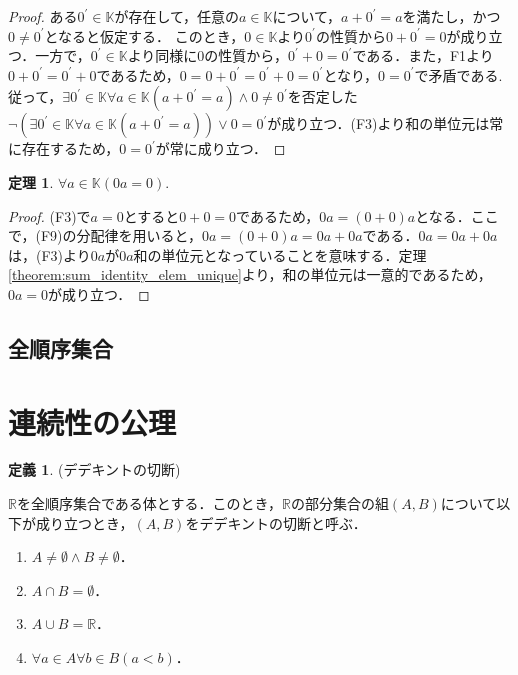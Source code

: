 \documentclass[oneside,openany]{jbook}
\theoremstyle{definition}
\newtheorem{theorem}{定理}
\newtheorem{definition}{定義}
\begin{document}
\begin{proof}
ある$0^{\prime} \in \mathbb{K}$が存在して，任意の$a \in \mathbb{K}$について，$a+0^{\prime}=a$を満たし，かつ$0 \neq 0^{\prime}$となると仮定する．
このとき，$0 \in \mathbb{K}$より$0^{\prime}$の性質から$0 + 0^{\prime} = 0$が成り立つ．一方で，$0^{\prime}  \in \mathbb{K}$より同様に$0$の性質から，$0^{\prime} + 0 = 0^{\prime}$である．また，F1より$0+0^{\prime}=0^{\prime}+0$であるため，$0=0+0^{\prime}=0^{\prime}+0=0^{\prime}$となり，$0=0^{\prime}$で矛盾である.
従って，$\exists 0^{\prime} \in \mathbb{K} \forall a \in \mathbb{K}(a + 0^{\prime} = a) \land 0\neq0^{\prime}$を否定した$\lnot (\exists 0^{\prime} \in \mathbb{K} \forall a \in \mathbb{K}(a + 0^{\prime} = a) ) \lor 0 = 0^{\prime}$が成り立つ．(F3)より和の単位元は常に存在するため，$0 = 0^{\prime}$が常に成り立つ．
\end{proof}

\begin{theorem}
$\forall a \in \mathbb{K} (0a = 0)$.
\end{theorem}

\begin{proof}
(F3)で$a=0$とすると$0+0=0$であるため，$0a = (0 + 0)a$となる．ここで，(F9)の分配律を用いると，$0a = (0+0)a=0a+0a$である．$0a =0a+0a$は，(F3)より$0a$が$0a$和の単位元となっていることを意味する．定理\ref{theorem:sum_identity_elem_unique}より，和の単位元は一意的であるため，$0a = 0$が成り立つ．
\end{proof}


\subsection{全順序集合}

\section{連続性の公理}
\begin{definition}{(デデキントの切断)}

$\mathbb{R}$を全順序集合である体とする．このとき，$\mathbb{R}$の部分集合の組$( A, B)$について以下が成り立つとき，$( A, B)$をデデキントの切断と呼ぶ．

\begin{enumerate}
\item $A \neq \emptyset \land B \neq \emptyset$．
\item $A \cap B = \emptyset$．
\item $A \cup B = \mathbb{R}$．
\item $\forall a \in A \forall b \in B (a < b)$．
\end{enumerate}

\end{definition}
\end{document}
